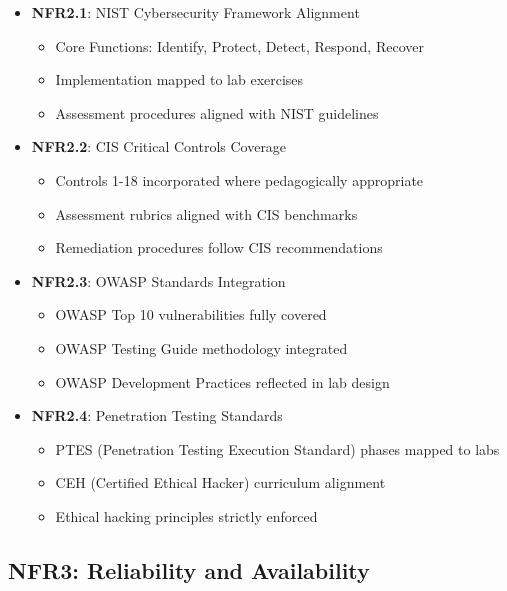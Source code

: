 \begin{itemize}

\item \textbf{NFR2.1}: NIST Cybersecurity Framework Alignment~\cite{nist_framework}
\begin{itemize}
\item Core Functions: Identify, Protect, Detect, Respond, Recover
\item Implementation mapped to lab exercises
\item Assessment procedures aligned with NIST guidelines
\end{itemize}

\item \textbf{NFR2.2}: CIS Critical Controls Coverage~\cite{cis_controls}
\begin{itemize}
\item Controls 1-18 incorporated where pedagogically appropriate
\item Assessment rubrics aligned with CIS benchmarks
\item Remediation procedures follow CIS recommendations
\end{itemize}

\item \textbf{NFR2.3}: OWASP Standards Integration~\cite{owasp2021,owasp_testing_guide}
\begin{itemize}
\item OWASP Top 10 vulnerabilities fully covered
\item OWASP Testing Guide methodology integrated
\item OWASP Development Practices reflected in lab design
\end{itemize}

\item \textbf{NFR2.4}: Penetration Testing Standards~\cite{ptes,ceh_framework}
\begin{itemize}
\item PTES (Penetration Testing Execution Standard) phases mapped to labs
\item CEH (Certified Ethical Hacker) curriculum alignment
\item Ethical hacking principles strictly enforced
\end{itemize}

\end{itemize}

\subsection{NFR3: Reliability and Availability}

